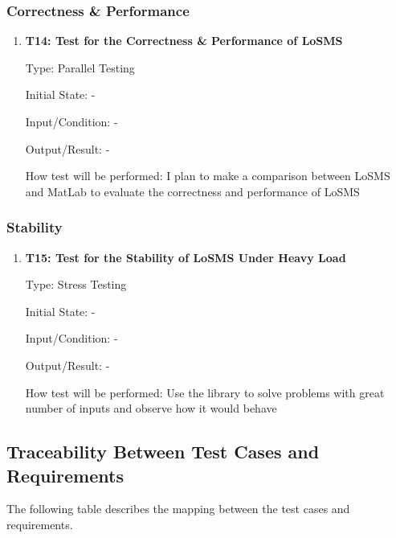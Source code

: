 \documentclass[12pt, titlepage]{article}
\newcommand{\famname}{LoSMS} %
\begin{document}
\subsubsection{Correctness \& Performance}

\begin{enumerate}
	\item{\textbf{T14: Test for the Correctness \& Performance of \famname{}}}
	
	Type: Parallel Testing
	
	Initial State: -
	
	Input/Condition: -
	
	Output/Result: -
	
	How test will be performed: I plan to make a comparison between \famname{} 
	and MatLab to evaluate the correctness and performance of \famname{}
\end{enumerate}

\subsubsection{Stability}

\begin{enumerate}
	\item{\textbf{T15: Test for the Stability of \famname{} Under Heavy Load}}
	
	Type: Stress Testing
	
	Initial State: -
	
	Input/Condition: -
	
	Output/Result: -
	
	How test will be performed: Use the library to solve problems with great 
	number of inputs and observe how it would behave 

\end{enumerate}

\subsection{Traceability Between Test Cases and Requirements}

The following table describes the mapping between the test cases and 
requirements.
\end{document}
